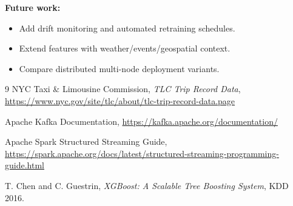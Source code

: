 \documentclass[conference]{IEEEtran}
\begin{document}
\textbf{Future work:}
\begin{itemize}[leftmargin=1.5em]
    \item Add drift monitoring and automated retraining schedules.
    \item Extend features with weather/events/geospatial context.
    \item Compare distributed multi-node deployment variants.
\end{itemize}


\begin{thebibliography}{9}
NYC Taxi \& Limousine Commission,
\textit{TLC Trip Record Data},
\url{https://www.nyc.gov/site/tlc/about/tlc-trip-record-data.page}

Apache Kafka Documentation,
\url{https://kafka.apache.org/documentation/}

Apache Spark Structured Streaming Guide,
\url{https://spark.apache.org/docs/latest/structured-streaming-programming-guide.html}

T. Chen and C. Guestrin,
\textit{XGBoost: A Scalable Tree Boosting System}, KDD 2016.
\end{thebibliography}
\end{document}

